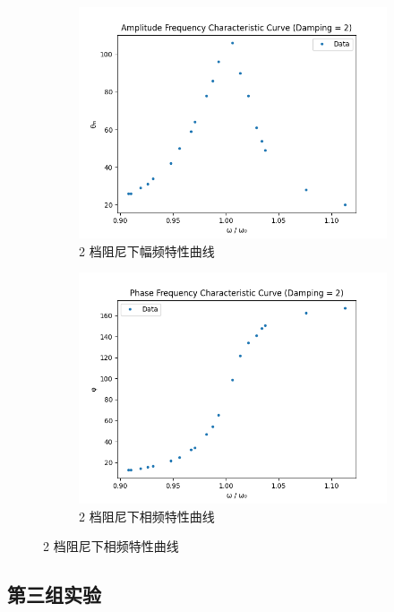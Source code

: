 \documentclass[12pt,a4paper]{amsart}
\begin{document}
\begin{figure}[H]
	\begin{subfigure}[b]{0.49\linewidth}
		\centering
		\includegraphics[width=\linewidth]{img/B_2.png}
		\caption{2 档阻尼下幅频特性曲线}
		\label{fig:B_2}
	\end{subfigure}
	\hfill
	\begin{subfigure}[b]{0.49\linewidth}
		\centering
		\includegraphics[width=\linewidth]{img/B_3.png}
		\caption{2 档阻尼下相频特性曲线}
		\label{fig:B_3}
	\end{subfigure}
\end{figure}

\subsection{第三组实验}
\end{document}
